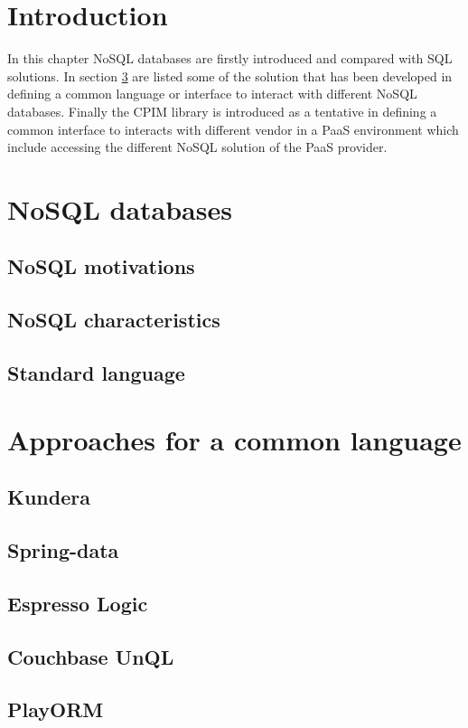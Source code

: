\section{Introduction}
In this chapter NoSQL databases are firstly introduced and compared with SQL solutions. In section \ref{sec:common-language} are listed some of the solution that has been developed in defining a common language or interface to interact with different NoSQL databases.
\noindent Finally the CPIM library is introduced as a tentative in defining a common interface to interacts with different vendor in a PaaS environment which include accessing the different NoSQL solution of the PaaS provider.

\section{NoSQL databases}
\subsection{NoSQL motivations}
\subsection{NoSQL characteristics}
\subsection{Standard language}

\section{Approaches for a common language}
\label{sec:common-language}
\subsection{Kundera}
\subsection{Spring-data}
\subsection{Espresso Logic}
\subsection{Couchbase UnQL}
\subsection{PlayORM}
